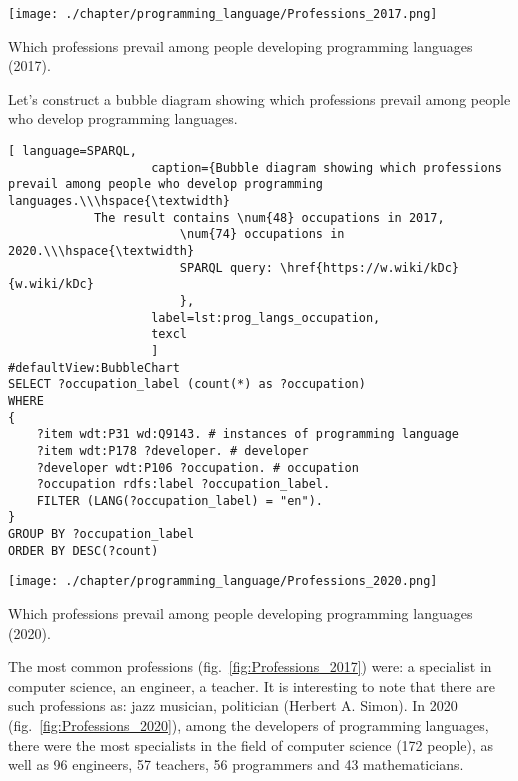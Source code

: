 \begin{marginfigure}[-5cm]
	\texttt{[image: ./chapter/programming\_language/Professions\_2017.png]}
	\caption{Which professions prevail among people developing programming languages (2017).}
	\label{fig:Professions_2017}
\end{marginfigure}

Let's construct a bubble diagram showing which professions prevail among people who develop programming languages.

\begin{lstlisting}[ language=SPARQL, 
                    caption={Bubble diagram showing which professions prevail among people who develop programming languages.\\\hspace{\textwidth}
			The result contains \num{48} occupations in 2017, 
                        \num{74} occupations in 2020.\\\hspace{\textwidth}
                        SPARQL query: \href{https://w.wiki/kDc}{w.wiki/kDc}
                        },
                    label=lst:prog_langs_occupation,
                    texcl 
                    ]
#defaultView:BubbleChart
SELECT ?occupation_label (count(*) as ?occupation)
WHERE
{
    ?item wdt:P31 wd:Q9143. # instances of programming language 
    ?item wdt:P178 ?developer. # developer
    ?developer wdt:P106 ?occupation. # occupation
    ?occupation rdfs:label ?occupation_label. 
    FILTER (LANG(?occupation_label) = "en"). 
}
GROUP BY ?occupation_label 
ORDER BY DESC(?count)
\end{lstlisting}%

\begin{marginfigure}
	\texttt{[image: ./chapter/programming\_language/Professions\_2020.png]}
	\caption{Which professions prevail among people developing programming languages (2020).}
	\label{fig:Professions_2020}
\end{marginfigure}

The most common professions (fig.~\ref{fig:Professions_2017}) were: a specialist in computer science, an engineer, a teacher. It is interesting to note that there are such professions as: jazz musician, politician (Herbert A. Simon). In 2020 (fig.~\ref{fig:Professions_2020}), among the developers of programming languages, there were the most specialists in the field of computer science (172 people), as well as 96 engineers, 57 teachers, 56 programmers and 43 mathematicians.

